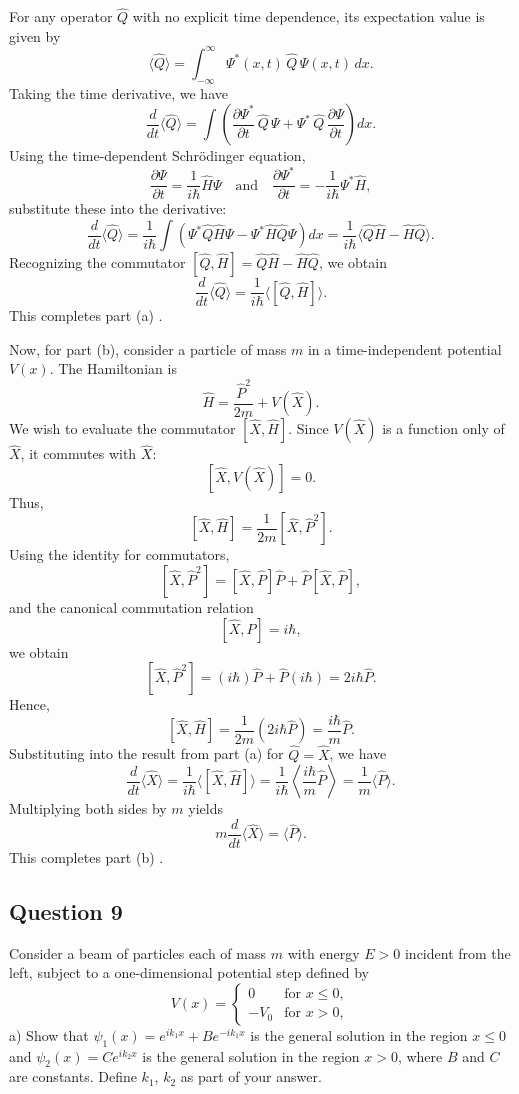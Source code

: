 \documentclass{article}
\begin{document}
For any operator $\hat{Q}$ with no explicit time dependence, its expectation value is given by
\[
\langle \hat{Q} \rangle = \int_{-\infty}^{\infty} \Psi^*(x,t) \, \hat{Q} \, \Psi(x,t) \, dx.
\]
Taking the time derivative, we have
\[
\frac{d}{dt}\langle \hat{Q} \rangle = \int \left( \frac{\partial \Psi^*}{\partial t} \, \hat{Q} \, \Psi + \Psi^* \, \hat{Q} \, \frac{\partial \Psi}{\partial t} \right) dx.
\]
Using the time-dependent Schrödinger equation,
\[
\frac{\partial \Psi}{\partial t} = \frac{1}{i\hbar} \hat{H} \Psi \quad \text{and} \quad \frac{\partial \Psi^*}{\partial t} = -\frac{1}{i\hbar} \Psi^* \hat{H},
\]
substitute these into the derivative:
\[
\frac{d}{dt}\langle \hat{Q} \rangle = \frac{1}{i\hbar} \int \left( \Psi^* \hat{Q} \hat{H} \Psi - \Psi^* \hat{H} \hat{Q} \Psi \right) dx = \frac{1}{i\hbar}\langle \hat{Q}\hat{H} - \hat{H}\hat{Q} \rangle.
\]
Recognizing the commutator $[\hat{Q},\hat{H}] = \hat{Q}\hat{H} - \hat{H}\hat{Q}$, we obtain
\[
\boxed{\frac{d}{dt}\langle \hat{Q} \rangle = \frac{1}{i\hbar}\langle [\hat{Q},\hat{H}] \rangle.}
\]
This completes part (a) \quad [5 marks].

Now, for part (b), consider a particle of mass $m$ in a time-independent potential $V(x)$. The Hamiltonian is
\[
\hat{H} = \frac{\hat{P}^2}{2m} + V(\hat{X}).
\]
We wish to evaluate the commutator $[\hat{X}, \hat{H}]$. Since $V(\hat{X})$ is a function only of $\hat{X}$, it commutes with $\hat{X}$:
\[
[\hat{X}, V(\hat{X})] = 0.
\]
Thus,
\[
[\hat{X}, \hat{H}] = \frac{1}{2m}[\hat{X}, \hat{P}^2].
\]
Using the identity for commutators,
\[
[\hat{X}, \hat{P}^2] = [\hat{X}, \hat{P}]\hat{P} + \hat{P}[\hat{X}, \hat{P}],
\]
and the canonical commutation relation
\[
[\hat{X}, \hat{P}] = i\hbar,
\]
we obtain
\[
[\hat{X}, \hat{P}^2] = (i\hbar)\hat{P} + \hat{P}(i\hbar) = 2i\hbar \hat{P}.
\]
Hence,
\[
[\hat{X}, \hat{H}] = \frac{1}{2m} (2i\hbar \hat{P}) = \frac{i\hbar}{m}\hat{P}.
\]
Substituting into the result from part (a) for $\hat{Q} = \hat{X}$, we have
\[
\frac{d}{dt}\langle \hat{X} \rangle = \frac{1}{i\hbar}\langle [\hat{X}, \hat{H}] \rangle = \frac{1}{i\hbar} \left\langle \frac{i\hbar}{m}\hat{P} \right\rangle = \frac{1}{m}\langle \hat{P} \rangle.
\]
Multiplying both sides by $m$ yields
\[
\boxed{m\frac{d}{dt}\langle \hat{X} \rangle = \langle \hat{P} \rangle.}
\]
This completes part (b) \quad [4 marks].


\subsection{Question 9}
Consider a beam of particles each of mass $m$ with energy $E > 0$ incident from the left, subject to a one-dimensional potential step defined by
\[
V(x) =
\begin{cases}
0 & \text{for } x \leq 0, \\
-V_0 & \text{for } x > 0,
\end{cases}
\]
a) Show that $\psi_1(x) = e^{ik_1x} + Be^{-ik_1x}$ is the general solution in the region $x \leq 0$ and $\psi_2(x) = Ce^{ik_2x}$ is the general solution in the region $x > 0$, where $B$ and $C$ are constants. Define $k_1$, $k_2$ as part of your answer.
\end{document}

